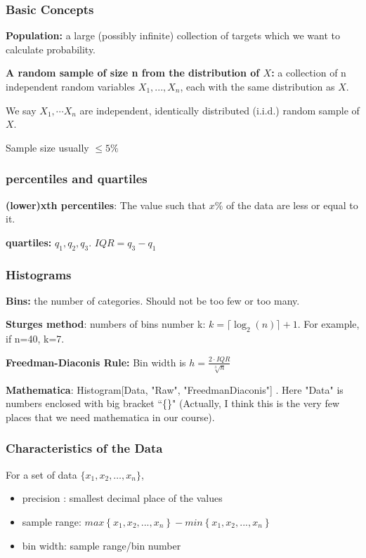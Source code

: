 \documentclass{beamer}
\begin{document}
\begin{frame}
    \frametitle{Basic Concepts}
    \textbf{Population:} a large (possibly infinite) collection of targets which we want to calculate probability.\par
    \textbf{A random sample of size n from the distribution of $X$:} a collection of n independent random variables $X_1,...,X_n$, each with the same distribution as $X$.\par
    We say $X_1,\cdots X_n$ are independent, identically distributed (i.i.d.) random sample of $X$. \par
    Sample size usually $\leq 5\%$

\end{frame}

\begin{frame}
    \frametitle{percentiles and quartiles}
    \textbf{(lower)xth percentiles}: The value such that $x\%$ of the data are less or equal to it.\par
    \textbf{quartiles: }$q_1, q_2, q_3$. $IQR=q_3-q_1$
    

\end{frame}

\begin{frame}
    \frametitle{Histograms}

    \textbf{Bins:} the number of categories. Should not be too few or too many.\par
    \textbf{Sturges method}: numbers of bins number k: $k=\lceil \log_{2}{(n)}\rceil+1$. For example, if n=40, k=7.\par
    \textbf{Freedman-Diaconis Rule:} Bin width is $h=\frac{2\cdot IQR}{\sqrt[3]{n}}$\par
    \textbf{Mathematica}: Histogram[Data, {"Raw", "FreedmanDiaconis"}] . Here "Data" is numbers enclosed with big bracket ``\{\}" (Actually, I think this is the very few places that we need mathematica in our course).
\end{frame}

\begin{frame}
    \frametitle{Characteristics of the Data}
    For a set of data $\{x_1, x_2, \dots , x_n\}$, 
    \begin{itemize}
        \item precision : smallest decimal place of the values
        \item sample range: $max\left\{ x_1, x_2,...,x_n \right\}-min\left\{ x_1, x_2,...,x_n \right\}$
        \item bin width: sample range/bin number
        
    \end{itemize}

\end{frame}
\end{document}
